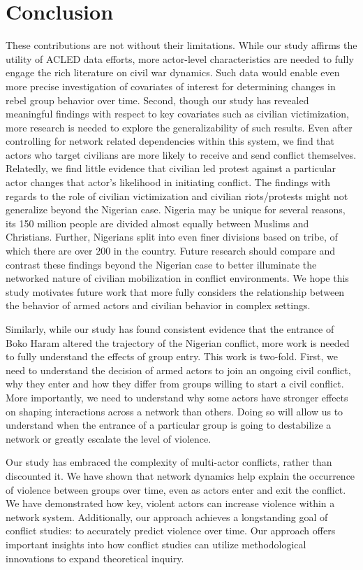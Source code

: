 \section*{Conclusion}
These contributions are not without their limitations. While our study affirms the utility of ACLED data efforts, more actor-level characteristics are needed to fully engage the rich literature on civil war dynamics. Such data would enable even more precise investigation of covariates of interest for determining changes in rebel group behavior over time. Second, though our study has revealed meaningful findings with respect to key covariates such as civilian victimization, more research is needed to explore the generalizability of such results. Even after controlling for network related dependencies within this system, we find that actors who target civilians are more likely to receive and send conflict themselves. Relatedly, we find little evidence that civilian led protest against a particular actor changes that actor's likelihood in initiating conflict.  The findings with regards to the role of civilian victimization and civilian riots/protests might not generalize beyond the Nigerian case. Nigeria may be unique for several reasons, its 150 million people are divided almost equally between Muslims and Christians. Further, Nigerians split into even finer divisions based on tribe, of which there are over 200 in the country. Future research should compare and contrast these findings beyond the Nigerian case to better illuminate the networked nature of civilian mobilization in conflict environments.  We hope this study motivates future work that more fully considers the relationship between the behavior of armed actors and civilian behavior in complex settings.

Similarly, while our study has found consistent evidence that the entrance of Boko Haram altered the trajectory of the Nigerian conflict, more work is needed to fully understand the effects of group entry. This work is two-fold. First, we need to understand the decision of armed actors to join an ongoing civil conflict, why they enter and how they differ from groups willing to start a civil conflict. More importantly, we need to understand why some actors have stronger effects on shaping interactions across a network than others. Doing so will allow us to understand when the entrance of a particular group is going to destabilize a network or greatly escalate the level of violence. 

Our study has embraced the complexity of multi-actor conflicts, rather than discounted it. We have shown that network dynamics help explain the occurrence of violence between groups over time, even as actors enter and exit the conflict. We have demonstrated how key, violent actors can increase violence within a network system. Additionally, our approach achieves a longstanding goal of conflict studies: to accurately predict violence over time. Our approach offers important insights into how conflict studies can utilize methodological innovations to expand theoretical inquiry. 